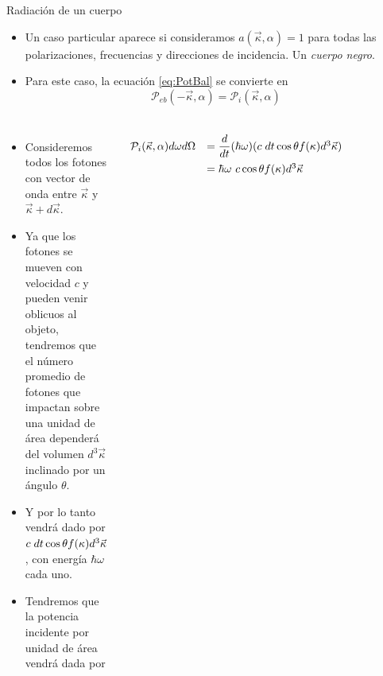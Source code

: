 \documentclass[aspectratio=1610]{beamer}
\newcommand{\kv}{\Vec{\kappa}}
\begin{document}
\begin{frame}{Radiación de un cuerpo}
	\begin{itemize}
		\item Un caso particular aparece si consideramos $a(\kv,\alpha) = 1$ para todas las polarizaciones, frecuencias y direcciones de incidencia. Un \emph{cuerpo negro}.\pause
		\item Para este caso, la ecuación \ref{eq:PotBal} se convierte en
		\begin{equation}
			\mathcal{P}_{eb}(-\kv,\alpha) = \mathcal{P}_i(\kv,\alpha)
		\end{equation}
	\end{itemize}
\end{frame}

\begin{frame}
	\begin{columns}
		\begin{itemize}
			\item Consideremos todos los fotones con vector de onda entre $\kv$ y $\kv+d\kv$.\pause
			\item Ya que los fotones se mueven con velocidad $c$ y pueden venir oblicuos al objeto, tendremos que el número promedio de fotones que impactan sobre una unidad de área dependerá del volumen $d^3\kv$ inclinado por un ángulo $\theta$.
			\item Y por lo tanto vendrá dado por $c\hspace{1mm} dt \cos{\theta} f(\kappa) d^3\kv$, con energía $\hbar\omega$ cada uno.\pause
			\item Tendremos que la potencia incidente por unidad de área vendrá dada por
		\end{itemize}
		\begin{equation}
			\begin{array}{rl}
				\mathcal{P}_i(\kv,\alpha)d\omega d\Omega &= \dfrac{d}{dt}(\hbar\omega) (c\hspace{1mm} dt \cos{\theta} f(\kappa) d^3\kv) \\[2ex]
				&= \hbar\omega\ c \cos{\theta} f(\kappa) d^3\kv
			\end{array}
		\end{equation}
		
		\begin{figure}
			
			
			

\end{figure}
\end{columns}
\end{frame}
\end{document}
